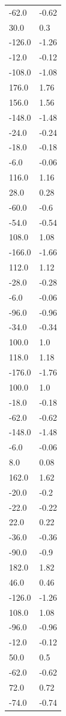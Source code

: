 \begin{longtable}{ll}
-62.0 & -0.62 \\
30.0 & 0.3 \\
-126.0 & -1.26 \\
-12.0 & -0.12 \\
-108.0 & -1.08 \\
176.0 & 1.76 \\
156.0 & 1.56 \\
-148.0 & -1.48 \\
-24.0 & -0.24 \\
-18.0 & -0.18 \\
-6.0 & -0.06 \\
116.0 & 1.16 \\
28.0 & 0.28 \\
-60.0 & -0.6 \\
-54.0 & -0.54 \\
108.0 & 1.08 \\
-166.0 & -1.66 \\
112.0 & 1.12 \\
-28.0 & -0.28 \\
-6.0 & -0.06 \\
-96.0 & -0.96 \\
-34.0 & -0.34 \\
100.0 & 1.0 \\
118.0 & 1.18 \\
-176.0 & -1.76 \\
100.0 & 1.0 \\
-18.0 & -0.18 \\
-62.0 & -0.62 \\
-148.0 & -1.48 \\
-6.0 & -0.06 \\
8.0 & 0.08 \\
162.0 & 1.62 \\
-20.0 & -0.2 \\
-22.0 & -0.22 \\
22.0 & 0.22 \\
-36.0 & -0.36 \\
-90.0 & -0.9 \\
182.0 & 1.82 \\
46.0 & 0.46 \\
-126.0 & -1.26 \\
108.0 & 1.08 \\
-96.0 & -0.96 \\
-12.0 & -0.12 \\
50.0 & 0.5 \\
-62.0 & -0.62 \\
72.0 & 0.72 \\
-74.0 & -0.74 \\

\end{longtable}
